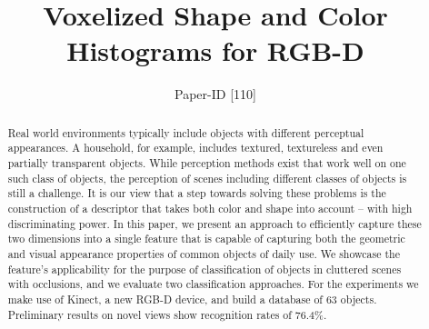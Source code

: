 \documentclass[conference]{sty/IEEEtran}
\begin{document}
\title{Voxelized Shape and Color Histograms for RGB-D}

\author{Paper-ID [110]}


\newcommand{\todo}[1]{\textbf{\textcolor{red}{TODO: #1}}}
\maketitle

\begin{abstract}
Real world environments typically include objects with different perceptual appearances.
A household, for example, includes textured, textureless and even partially transparent objects.
While perception methods exist that work well on one such class of objects, the perception of
scenes including different classes of objects is still a challenge.
It is our view that a step towards solving these problems is the
construction of a descriptor that takes both color and shape
into account -- with high discriminating power.
In this paper, we
present an approach to efficiently capture these two dimensions
into a single feature
that is capable of capturing both the geometric and visual appearance
properties of common objects of daily use. We showcase the
feature's applicability for the purpose of classification of objects in cluttered scenes with occlusions,
and we evaluate two classification approaches.
For the experiments we make use of Kinect, a new RGB-D device,
and build a database of 63 objects. Preliminary results
on novel views show recognition rates of 76.4\%.
\end{abstract}
\end{document}
